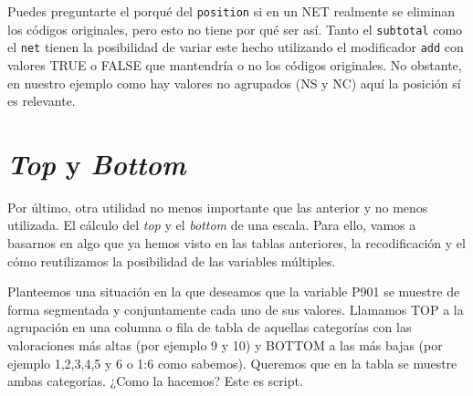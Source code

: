 \documentclass[
]{book}
\begin{document}
Puedes preguntarte el porqué del \texttt{position} si en un NET realmente se eliminan los códigos originales, pero esto no tiene por qué ser así. Tanto el \texttt{subtotal} como el \texttt{net} tienen la posibilidad de variar este hecho utilizando el modificador \texttt{add} con valores TRUE o FALSE que mantendría o no los códigos originales. No obstante, en nuestro ejemplo como hay valores no agrupados (NS y NC) aquí la posición sí es relevante.

\hypertarget{top-y-bottom}{%
\section{\texorpdfstring{\emph{Top} y \emph{Bottom}}{Top y Bottom}}\label{top-y-bottom}}

Por último, otra utilidad no menos importante que las anterior y no menos utilizada. El cálculo del \emph{top} y el \emph{bottom} de una escala. Para ello, vamos a basarnos en algo que ya hemos visto en las tablas anteriores, la recodificación y el cómo reutilizamos la posibilidad de las variables múltiples.

Planteemos una situación en la que deseamos que la variable P901 se muestre de forma segmentada y conjuntamente cada uno de sus valores. Llamamos TOP a la agrupación en una columna o fila de tabla de aquellas categorías con las valoraciones más altas (por ejemplo 9 y 10) y BOTTOM a las más bajas (por ejemplo 1,2,3,4,5 y 6 o 1:6 como sabemos). Queremos que en la tabla se muestre ambas categorías. ¿Como la hacemos? Este es script.
\end{document}
